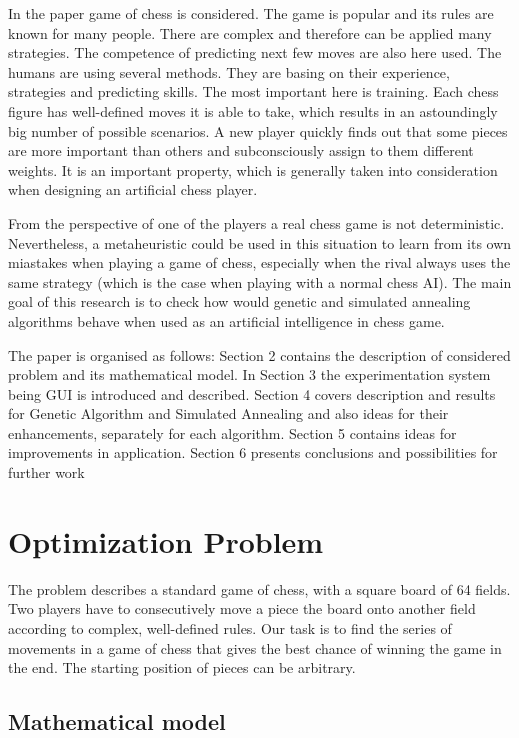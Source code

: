 \documentclass[pdftex]{article}
\begin{document}
In the paper game of chess is considered. The game is popular and its rules are known for many people. There are complex and therefore can be applied many strategies. The competence of predicting next few moves are also here used. The humans are using several methods. They are basing on their experience, strategies and predicting skills.
The most important here is training. Each chess figure has well-defined moves it is able to take, which results in an astoundingly big number of possible scenarios. A new player quickly finds out that some pieces are more important than others and subconsciously assign to them different weights. It is an important property, which is generally taken into consideration when designing an artificial chess player.~\cite{comparison}


From the perspective of one of the players a real chess game is not deterministic. Nevertheless, a metaheuristic could be used in this situation to learn from its own miastakes when playing a game of chess, especially when the rival always uses the same strategy (which is the case when playing with a normal chess AI). The main goal of this research is to check how would genetic and simulated annealing algorithms behave when used as an artificial intelligence in chess game.


The paper is organised as follows: Section 2 contains the description of considered problem and its mathematical model. In Section 3 the experimentation system being GUI is introduced and described. Section 4 covers description and results for Genetic Algorithm and Simulated Annealing and also ideas for their enhancements, separately for each algorithm. Section 5 contains ideas for improvements in application. Section 6 presents conclusions and possibilities for further work

\section{Optimization Problem}
\label{sec:problem}

The problem describes a standard game of chess, with a square board of 64 fields. Two players have to consecutively move a piece the board onto another field according to complex, well-defined rules. Our task is to find the series of movements in a game of chess that gives the best chance of winning the game in the end. The starting position of pieces can be arbitrary. 

\subsection{Mathematical model}
\label{sec:model}
\end{document}
